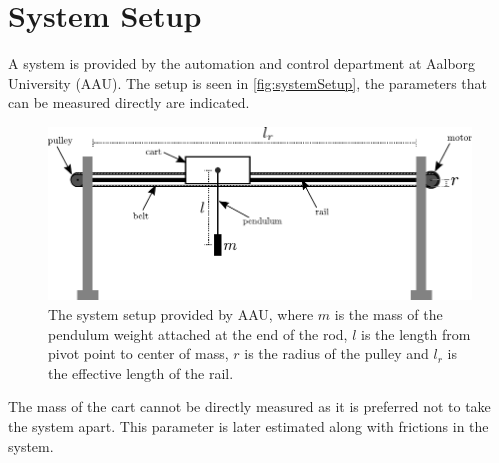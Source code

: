 \section{System Setup}
A system is provided by the automation and control department at Aalborg University (AAU). The setup is seen in \autoref{fig:systemSetup}, the parameters that can be measured directly are indicated.

\begin{figure}[H]
  \includegraphics[width=.8\textwidth]{figures/systemSetup}
  \caption{The system setup provided by AAU, where $m$ is the mass of the pendulum weight attached at the end of the rod, $l$ is the length from pivot point to center of mass, $r$ is the radius of the pulley and $l_r$ is the effective length of the rail.}
  \label{fig:systemSetup}
\end{figure}

The mass of the cart cannot be directly measured as it is preferred not to take the system apart. This parameter is later estimated along with frictions in the system.

